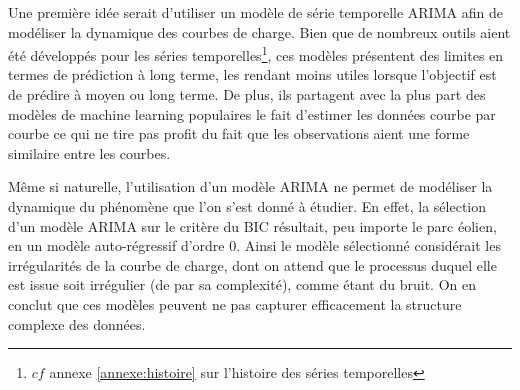 Une première idée serait d'utiliser un modèle de série temporelle ARIMA afin de modéliser la dynamique des courbes de charge. Bien que de nombreux outils aient été développés pour les séries temporelles\footnote{$cf$ annexe \ref{annexe:histoire} sur l'histoire des séries temporelles}, ces modèles présentent des limites en termes de prédiction à long terme, les rendant moins utiles lorsque l'objectif est de prédire à moyen ou long terme. De plus, ils partagent avec la plus part des modèles de machine learning populaires le fait d'estimer les données courbe par courbe ce qui ne tire pas profit du fait que les observations aient une forme similaire entre les courbes.

\smallskip
% 

Même si naturelle, l'utilisation d'un modèle ARIMA ne permet de modéliser la dynamique du phénomène que l'on s'est donné à étudier. En effet, la sélection d'un modèle ARIMA sur le critère du BIC résultait, peu importe le parc éolien, en un modèle auto-régressif d'ordre 0. Ainsi le modèle sélectionné considérait les irrégularités de la courbe de charge, dont on attend que le processus duquel elle est issue soit irrégulier (de par sa complexité), comme étant du bruit. On en conclut que ces modèles peuvent ne pas capturer efficacement la structure complexe des données.

\bigskip

\noindent
{}
